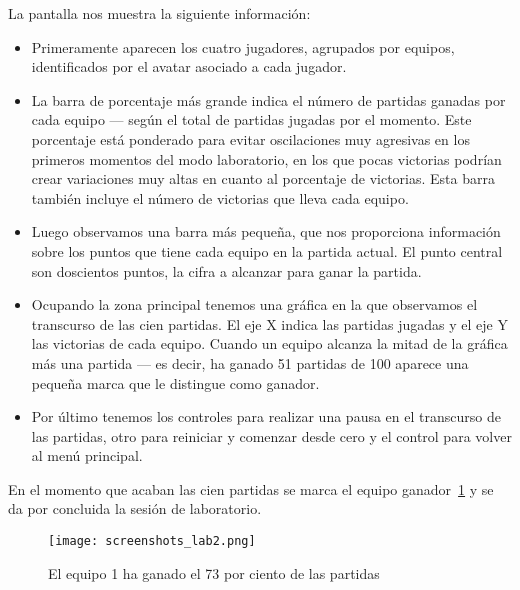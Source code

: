 La pantalla nos muestra la siguiente información:
\begin{itemize}
    \item Primeramente aparecen los cuatro jugadores, agrupados por equipos, identificados por el avatar asociado a cada jugador.
    \item La barra de porcentaje más grande indica el número de partidas ganadas por cada equipo --- según el total
            de partidas jugadas por el momento. Este porcentaje está ponderado para evitar oscilaciones muy agresivas
            en los primeros momentos del modo laboratorio, en los que pocas victorias podrían crear variaciones muy altas
            en cuanto al porcentaje de victorias. Esta barra también incluye el número de victorias que lleva cada equipo.
    \item Luego observamos una barra más pequeña, que nos proporciona información sobre los puntos que tiene cada
            equipo en la partida actual. El punto central son doscientos puntos, la cifra a alcanzar para ganar la partida. 
    \item Ocupando la zona principal tenemos una gráfica en la que observamos el transcurso de las cien partidas. El
            eje X indica las partidas jugadas y el eje Y las victorias de cada equipo. Cuando un equipo alcanza la mitad
            de la gráfica más una partida --- es decir, ha ganado 51 partidas de 100 aparece una pequeña marca que le
            distingue como ganador.
    \item Por último tenemos los controles para realizar una pausa en el transcurso de las partidas, otro para reiniciar
            y comenzar desde cero y el control para volver al menú principal.
\end{itemize}

En el momento que acaban las cien partidas se marca el equipo ganador~\ref{fig:screenshots_lab2} y se da por concluida
la sesión de laboratorio.

\begin{figure}[hp]
  \begin{center}
    \texttt{[image: screenshots\_lab2.png]}
  \end{center}
  \caption{El equipo 1 ha ganado el 73 por ciento de las partidas}
  \label{fig:screenshots_lab2}
\end{figure}


